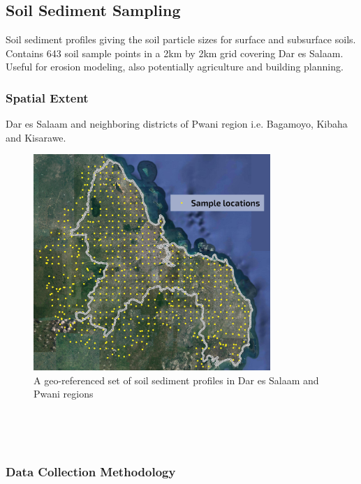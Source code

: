 \documentclass[a4paper,12pt,twoside]{article}
\begin{document}
\newpage
\subsection{Soil Sediment Sampling}

Soil sediment profiles giving the soil particle sizes for surface and subsurface soils. Contains 643 soil sample points in a 2km by 2km grid covering Dar es Salaam.
Useful for erosion modeling, also potentially agriculture and building planning. 

\subsubsection{Spatial Extent}
Dar es Salaam and neighboring districts of Pwani region i.e. Bagamoyo, Kibaha and Kisarawe.

\begin{figure}[h]
  {\color{RHblue}\caption{A geo-referenced set of soil sediment profiles in Dar es Salaam and Pwani regions}}
  \centering
  \includegraphics[width=0.8\textwidth]{images/soil_sample_locations.jpg}
\end{figure}

\

\

\subsubsection{Data Collection Methodology}
\end{document}
